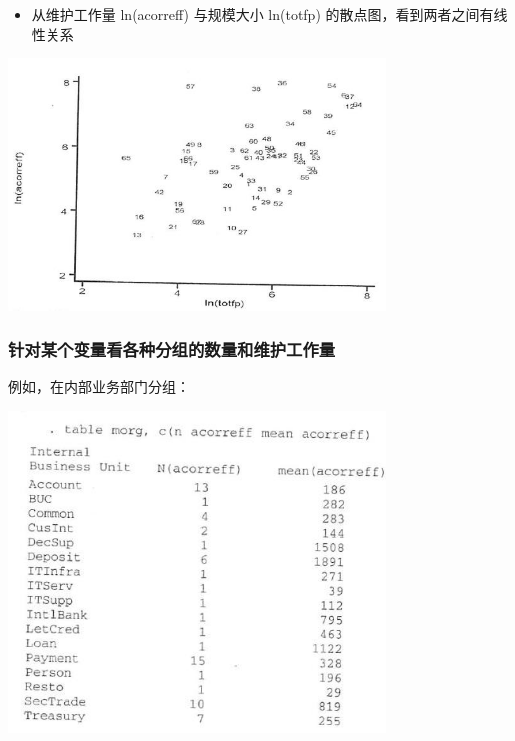 \begin{itemize}
\tightlist
\item
  从维护工作量 ln(acorreff) 与规模大小 ln(totfp)
  的散点图，看到两者之间有线性关系
\end{itemize}


\includegraphics[width=10cm]{maxwell_f529.jpg}

\hypertarget{ux9488ux5bf9ux67d0ux4e2aux53d8ux91cfux770bux5404ux79cdux5206ux7ec4ux7684ux6570ux91cfux548cux7ef4ux62a4ux5de5ux4f5cux91cf}{%
\subsubsection{针对某个变量看各种分组的数量和维护工作量}\label{ux9488ux5bf9ux67d0ux4e2aux53d8ux91cfux770bux5404ux79cdux5206ux7ec4ux7684ux6570ux91cfux548cux7ef4ux62a4ux5de5ux4f5cux91cf}}

例如，在内部业务部门分组：


\includegraphics[width=10cm]{maxwell_e514.jpg}

